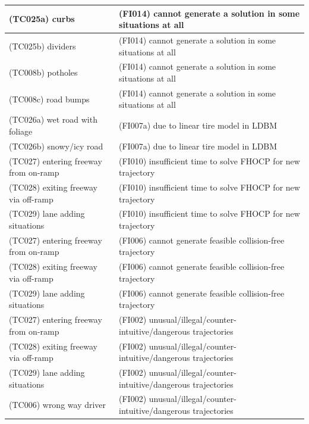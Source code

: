 \documentclass{article}
\begin{document}
\begin{longtable}{|p{8cm}|p{8cm}|}
\cellcolor{cViolet}(TC025a) curbs& \cellcolor{cBlue}(FI014) cannot generate a solution in some situations at all\\\hline
\cellcolor{cViolet}(TC025b) dividers& \cellcolor{cBlue}(FI014) cannot generate a solution in some situations at all\\\hline
\cellcolor{cRed}(TC008b) potholes& \cellcolor{cBlue}(FI014) cannot generate a solution in some situations at all\\\hline
\cellcolor{cRed}(TC008c) road bumps& \cellcolor{cBlue}(FI014) cannot generate a solution in some situations at all\\\hline
\cellcolor{cRed}(TC026a) wet road with foliage& \cellcolor{cBlue}(FI007a) due to linear tire model in LDBM\\\hline
\cellcolor{cRed}(TC026b) snowy/icy road& \cellcolor{cBlue}(FI007a) due to linear tire model in LDBM\\\hline
\cellcolor{cYellow}(TC027) entering freeway from on-ramp& \cellcolor{cBlue}(FI010) insufficient time to solve FHOCP for new trajectory\\\hline
\cellcolor{cYellow}(TC028) exiting freeway via off-ramp& \cellcolor{cBlue}(FI010) insufficient time to solve FHOCP for new trajectory\\\hline
\cellcolor{cYellow}(TC029) lane adding situations& \cellcolor{cBlue}(FI010) insufficient time to solve FHOCP for new trajectory\\\hline
\cellcolor{cYellow}(TC027) entering freeway from on-ramp& \cellcolor{cBlue}(FI006) cannot generate feasible collision-free trajectory\\\hline
\cellcolor{cYellow}(TC028) exiting freeway via off-ramp& \cellcolor{cBlue}(FI006) cannot generate feasible collision-free trajectory\\\hline
\cellcolor{cYellow}(TC029) lane adding situations& \cellcolor{cBlue}(FI006) cannot generate feasible collision-free trajectory\\\hline
\cellcolor{cYellow}(TC027) entering freeway from on-ramp& \cellcolor{cBlue}(FI002) unusual/illegal/counter-intuitive/dangerous trajectories\\\hline
\cellcolor{cYellow}(TC028) exiting freeway via off-ramp& \cellcolor{cBlue}(FI002) unusual/illegal/counter-intuitive/dangerous trajectories\\\hline
\cellcolor{cYellow}(TC029) lane adding situations& \cellcolor{cBlue}(FI002) unusual/illegal/counter-intuitive/dangerous trajectories\\\hline
\cellcolor{cGreen}(TC006) wrong way driver& \cellcolor{cBlue}(FI002) unusual/illegal/counter-intuitive/dangerous trajectories\\\hline

\end{longtable}
\end{document}
